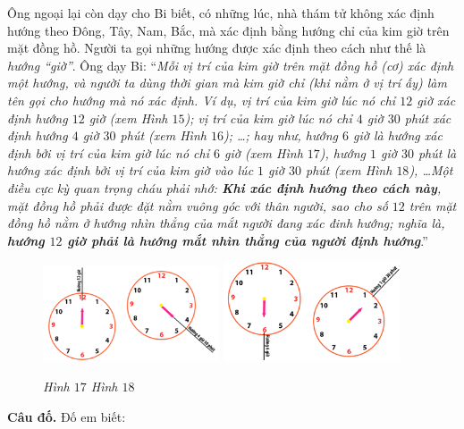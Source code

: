 	Ông ngoại lại còn dạy cho Bi biết, có những lúc, nhà thám tử không xác định hướng theo Đông, Tây, Nam, Bắc, mà xác định bằng hướng chỉ của kim giờ trên mặt đồng hồ. Người ta gọi những hướng được xác định theo cách như thế là \textit{hướng “giờ”}. Ông dạy Bi:
	\vskip 0.1cm
	“\textit{Mỗi vị trí của kim giờ trên mặt đồng hồ (cơ) xác định một hướng, và người ta dùng thời gian mà kim giờ chỉ (khi nằm ở vị trí ấy) làm tên gọi cho hướng mà nó xác định. Ví dụ, vị trí của kim giờ lúc nó chỉ $12$ giờ xác định hướng $12$ giờ (xem Hình $15$); vị trí của kim giờ lúc nó chỉ $4$ giờ $30$ phút xác định hướng $4$ giờ $30$ phút (xem Hình $16$); \ldots; hay như, hướng $6$ giờ là hướng xác định bởi vị trí của kim giờ lúc nó chỉ $6$ giờ (xem Hình $17$), hướng $1$ giờ $30$ phút là hướng xác định bởi vị trí của kim giờ vào lúc $1$ giờ $30$ phút (xem Hình $18$), \ldots Một điều cực kỳ quan trọng cháu phải nhớ: \textbf{Khi xác định hướng theo cách này}, mặt đồng hồ phải được đặt nằm vuông góc với thân người, sao cho số $12$ trên mặt đồng hồ nằm ở hướng nhìn thẳng của mắt người đang xác đinh hướng; nghĩa là, \textbf{hướng $12$ giờ phải là hướng mắt nhìn thẳng của người định hướng}}.”
		\begin{figure}[H]
		\centering
		\vspace*{4pt}
		\captionsetup{labelformat= empty, justification=centering}
		\includegraphics[width=0.465\textwidth]{pic15}
		\includegraphics[width=0.465\textwidth]{pic16}
		\caption{\small\textit{Hình $17$ \hspace*{70pt} Hình $18$}}
		\vspace*{-10pt}
	\end{figure}
	\textbf{Câu đố.} Đố em biết:

